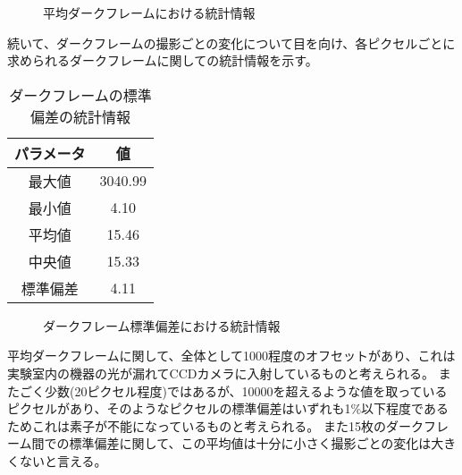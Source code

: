 \begin{figure}[!ht]
\centering


\caption[]{平均ダークフレームにおける統計情報}
\label{fig:darkflame_average_stat}
\end{figure}

続いて、ダークフレームの撮影ごとの変化について目を向け、各ピクセルごとに求められるダークフレームに関しての統計情報を示す。

\begin{table}[!ht]
\begin{center}
  \begin{tabular}{|c|c|} \hline
    パラメータ & 値 \\ \hline
    最大値 & 3040.99 \\
    最小値 & 4.10 \\
    平均値 & 15.46 \\
    中央値 & 15.33 \\
    標準偏差 & 4.11 \\ \hline
  \end{tabular}
  \caption{ダークフレームの標準偏差の統計情報}
  \label{tb:darkflame_deviation_data}
\end{center}
\end{table}

\begin{figure}[!ht]
\centering


\caption[]{ダークフレーム標準偏差における統計情報}
\label{fig:darkflame_deviation_stat}
\end{figure}

平均ダークフレームに関して、全体として1000程度のオフセットがあり、これは実験室内の機器の光が漏れてCCDカメラに入射しているものと考えられる。
またごく少数(20ピクセル程度)ではあるが、10000を超えるような値を取っているピクセルがあり、そのようなピクセルの標準偏差はいずれも1\%以下程度であるためこれは素子が不能になっているものと考えられる。
また15枚のダークフレーム間での標準偏差に関して、この平均値は十分に小さく撮影ごとの変化は大きくないと言える。

